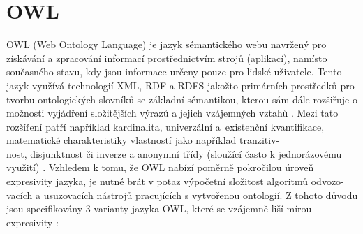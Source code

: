 \documentclass{projekt}
\begin{document}
\section{OWL}
\hspace{0.65cm}OWL (Web Ontology Language) je jazyk sémantického webu navržený pro získávání a zpracování informací prostřednictvím strojů (aplikací), namísto současného stavu, kdy jsou informace určeny pouze pro lidské uživatele. Tento jazyk využívá technologií XML, RDF a RDFS jakožto primárních prostředků pro tvorbu ontologických slovníků se základní sémantikou, kterou sám dále rozšiřuje o možnosti vyjádření složitějších výrazů a jejich vzájemných vztahů \cite{_35}. Mezi tato rozšíření patří například kardinalita, univerzální a~existenční kvantifikace, matematické charakteristiky vlastností jako například tranzitiv-\\nost, disjunktnost či inverze a anonymní třídy (sloužící  často k jednorázovému využití) \cite{_12}.
Vzhledem k tomu, že OWL nabízí poměrně pokročilou úroveň expresivity jazyka, je nutné brát v potaz výpočetní složitost algoritmů odvozo-\\vacích a usuzovacích nástrojů pracujících s vytvořenou ontologií. Z tohoto důvodu jsou specifikovány 3 varianty jazyka OWL, které se vzájemně liší mírou expresivity \cite{_2}:
\end{document}
